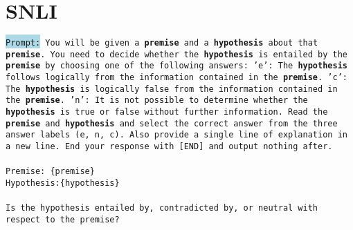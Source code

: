 \begin{table}[t]
    \centering
    \caption{An example of a lack of completeness in generated atoms for SNLI. Here the missing atom is \textit{``The movie is in the city.''}}
    \label{tab:completeness-snli}
\end{table}



\section{SNLI}
\begin{prompt}[title={Prompt \thetcbcounter: Traditional NLI}, label=prompt:nli]
\texttt{\colorbox{lightblue}{Prompt:} You will be given a \textbf{premise} and a \textbf{hypothesis} about that \textbf{premise}. You need to decide whether the \textbf{hypothesis} is entailed by the \textbf{premise} by choosing one of the following answers: 'e': The \textbf{hypothesis} follows logically from the information contained in the \textbf{premise}. 'c': The \textbf{hypothesis} is logically false from the information contained in the \textbf{premise}. 'n': It is not possible to determine whether the \textbf{hypothesis} is true or false without further information. Read the \textbf{premise} and \textbf{hypothesis} and select the correct answer from the three answer labels (e, n, c). Also provide a single line of explanation in a new line. End your response with [END] and output nothing after.\\\\Premise: \{premise\}\\Hypothesis:\{hypothesis\}\\\\Is the hypothesis entailed by, contradicted by, or neutral with respect to the premise?}
\end{prompt}

